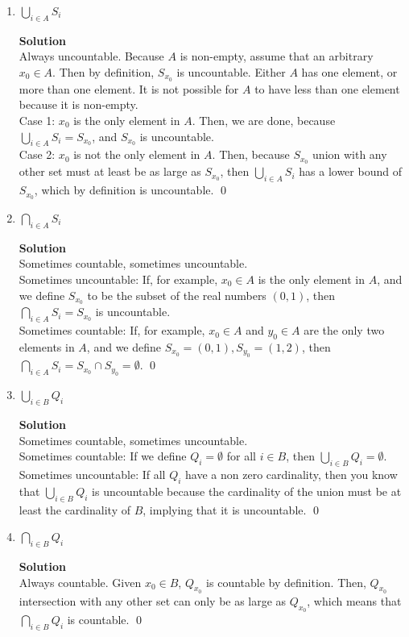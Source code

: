 \documentclass[11pt]{article}
\newenvironment{Parts}{\begin{enumerate}[label=(\alph*)]}{\end{enumerate}}
\newcommand*{\Part}{\item}
\begin{document}
\begin{Parts}
    
\Part $\bigcup_{i \in A} S_i$
\begin{mdframed} \textbf{Solution} \\
Always uncountable. Because $A$ is non-empty, assume that an arbitrary $x_0 \in A$. Then by definition, $S_{x_0}$ is uncountable. Either $A$ has one element, or more than one element. It is not possible for $A$ to have less than one element because it is non-empty. \\
Case 1: $x_0$ is the only element in $A$. Then, we are done, because $\bigcup_{i \in A} S_i = S_{x_0}$, and $S_{x_0}$ is uncountable. \\
Case 2: $x_0$ is not the only element in $A$. Then, because $S_{x_0}$ union with any other set must at least be as large as $S_{x_0}$, then $\bigcup_{i \in A} S_i$ has a lower bound of $S_{x_0}$, which by definition is uncountable. \qed
\end{mdframed}

\Part $\bigcap_{i \in A} S_i$ 
\begin{mdframed} \textbf{Solution} \\
Sometimes countable, sometimes uncountable. \\
Sometimes uncountable: If, for example, $x_0 \in A$ is the only element in $A$, and we define $S_{x_0}$ to be the subset of the real numbers $(0,1)$, then $\bigcap_{i \in A} S_i=S_{x_0}$ is uncountable. \\
Sometimes countable: If, for example, $x_0 \in A$ and $y_0 \in A$ are the only two elements in $A$, and we define $S_{x_0}=(0,1), S_{y_0}=(1,2)$, then $\bigcap_{i \in A} S_i=S_{x_0} \cap S_{y_0}=\emptyset$. \qed
\end{mdframed}

\Part $\bigcup_{i \in B} Q_i$
\begin{mdframed} \textbf{Solution} \\
Sometimes countable, sometimes uncountable. \\
Sometimes countable: If we define $Q_i=\emptyset$ for all $i \in B$, then $\bigcup_{i \in B} Q_i=\emptyset$. \\
Sometimes uncountable: If all $Q_i$ have a non zero cardinality, then you know that $\bigcup_{i \in B} Q_i$ is uncountable because the cardinality of the union must be at least the cardinality of $B$, implying that it is uncountable. \qed 
\end{mdframed}

\Part $\bigcap_{i \in B} Q_i$
\begin{mdframed} \textbf{Solution} \\
Always countable. Given $x_0 \in B$, $Q_{x_0}$ is countable by definition. Then, $Q_{x_0}$ intersection with any other set can only be as large as $Q_{x_0}$, which means that $\bigcap_{i \in B} Q_i$ is countable. \qed 
\end{mdframed}


\end{Parts}
\end{document}
